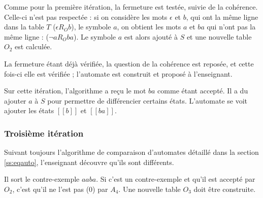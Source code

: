 \vspace{1cm}
Comme pour la première itération, la fermeture est testée, suivie de la cohérence. Celle-ci n'est pas respectée : si on considère les mots $\epsilon$ et $b$, qui ont la même ligne dans la table $T$ ($\epsilon R_O b$), le symbole $a$, on obtient les mots $a$ et $ba$ qui n'ont pas la même ligne : ($\neg a R_O ba$). Le symbole $a$ est alors ajouté à $S$ et une nouvelle table $O_2$ est calculée.

La fermeture étant déjà vérifiée, la question de la cohérence est reposée, et cette fois-ci elle est vérifiée ; l'automate est construit et proposé à l'enseignant.

Sur cette itération, l'algorithme a reçu le mot $ba$ comme étant accepté. Il a du ajouter $a$ à $S$ pour permettre de différencier certains états. L'automate se voit ajouter les états $[[b]]$ et $[[ba]]$.

\subsubsection{Troisième itération}

Suivant toujours l'algorithme de comparaison d'automates détaillé dans la section \ref{ss:eqauto}, l'enseignant découvre qu'ils sont différents.

Il sort le contre-exemple $aaba$. Si c'est un contre-exemple et qu'il est accepté par $O_2$, c'est qu'il ne l'est pas (0) par $A_4$. Une nouvelle table $O_3$ doit être construite.

